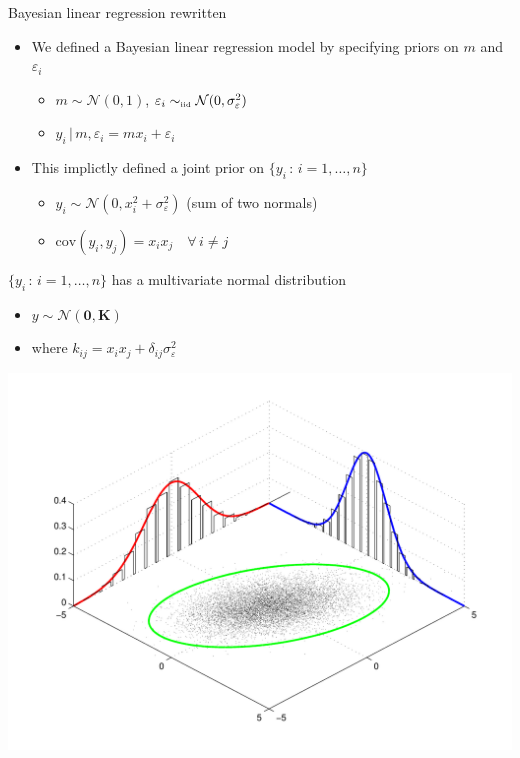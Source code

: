 \begin{frame}{Bayesian linear regression rewritten}
  \begin{itemize}
    \item We defined a Bayesian linear regression model by specifying priors on $m$ and $\varepsilon_i$
    \pause
    \begin{itemize}
      \item $m \sim \mathcal{N}(0, 1)$, $\varepsilon_i \sim_{\mbox{\tiny iid}} \mathcal{N}(0, \sigma_\varepsilon^2)$
      \pause
      \item $y_i \,|\, m, \varepsilon_i = mx_i + \varepsilon_i$
    \end{itemize}
    \vspace{\baselineskip}
    \pause
    \item This implictly defined a joint prior on $\{y_i \,:\, i=1,\ldots,n\}$
    \pause
    \begin{itemize}
      \item $y_i \sim \mathcal{N}(0, x_i^2 + \sigma_\varepsilon^2)$ (sum of two normals)
      \pause
      \item $\textrm{cov}(y_i, y_j) = x_i x_j \quad \forall\,i\neq j$
    \end{itemize}
  \end{itemize}
    \pause
      \fboxsep=0pt
	\noindent
		\begin{minipage}[t]{0.48\linewidth}
		  \vspace{-5.5\baselineskip}
			$\{y_i \,:\, i=1,\ldots,n\}$ has a multivariate normal distribution
    \begin{itemize}
      \item $y \sim \mathcal{N}(\mathbf{0}, \mathbf{K})$
      \item where $k_{ij} = x_i x_j + \delta_{ij} \sigma_\varepsilon^2$
    \end{itemize}
		\end{minipage}
		\hfill
		\begin{minipage}[t]{0.48\linewidth}
		\begin{center}
		  \includegraphics[width=0.9\linewidth]{figures/multi_norm}
		\end{center}
		\end{minipage}
\end{frame}

